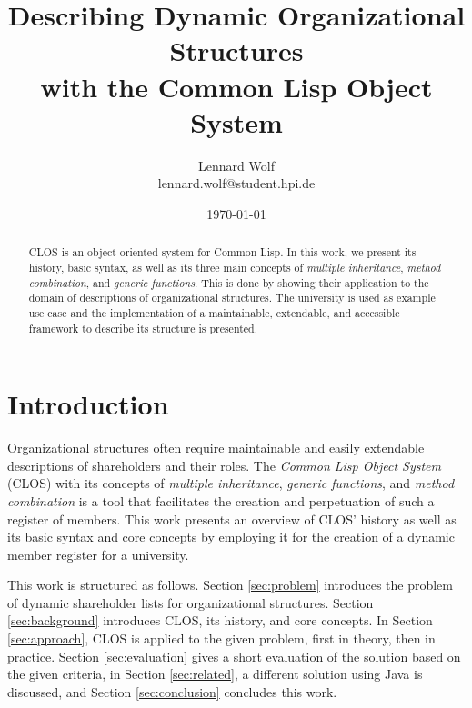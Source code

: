 \documentclass[oribibl]{llncs}
\author{Lennard Wolf \\
        lennard.wolf@student.hpi.de}
\institute{ Hasso Plattner Institute \\
            Prof.-Dr.-Helmert-Straße 2-3 \\
            14482 Potsdam \\
            Germany}
\title{Describing Dynamic Organizational Structures \\
 with the Common Lisp Object System}
\date{\today}
\begin{document}
\thispagestyle{empty}
\vfill

%
\maketitle
%
\begin{abstract}
CLOS is an object-oriented system for Common Lisp. In this work, we present its history, basic syntax, as well as its three main concepts of \emph{multiple inheritance}, \emph{method combination}, and \emph{generic functions}. This is done by showing their application to the domain of descriptions of organizational structures. The university is used as example use case and the implementation of a maintainable, extendable, and accessible framework to describe its structure is presented.

\end{abstract}
%


\section{Introduction}

Organizational structures often require maintainable and easily extendable descriptions of shareholders and their roles. The \emph{Common Lisp Object System} (CLOS) with its concepts of \emph{multiple inheritance}, \emph{generic functions}, and \emph{method combination} is a tool that facilitates the creation and perpetuation of such a register of members. This work presents an overview of CLOS' history as well as its basic syntax and core concepts by employing it for the creation of a dynamic member register for a university. 
\newline

This work is structured as follows. Section \ref{sec:problem} introduces the problem of dynamic shareholder lists for organizational structures. Section \ref{sec:background} introduces CLOS, its history, and core concepts. In Section \ref{sec:approach}, CLOS is applied to the given problem, first in theory, then in practice. Section \ref{sec:evaluation} gives a short evaluation of the solution based on the given criteria, in Section \ref{sec:related}, a different solution using Java is discussed, and Section \ref{sec:conclusion} concludes this work.
\end{document}

